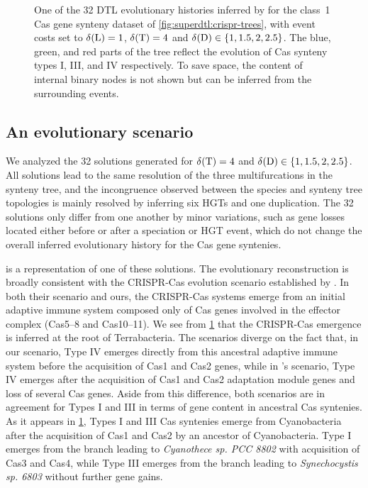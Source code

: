 \begin{figure}[htbp]
    \capstart
    \centering%
    \scalebox{.95}{}%
    \caption[Most parsimonious scenario for the CRISPR-Cas dataset under SuperDTL]{
        One of the 32 DTL evolutionary histories inferred by {\superdtl} for the class~1 Cas gene synteny dataset of \cref{fig:superdtl:crispr-trees}, with event costs set to \(\delta\kern.1pt(\mathrm{L}) = 1\), \(\delta\kern.1pt(\mathrm{T}) = 4\) and \(\delta\kern.1pt(\mathrm{D}) \in \{1, 1.5, 2, 2.5\}\).
        The blue, green, and red parts of the tree reflect the evolution of Cas synteny types I, III, and IV respectively.
        To save space, the content of internal binary nodes is not shown but can be inferred from the surrounding events.
        \label{fig:superdtl:crispr-scenario}
    }
\end{figure}

\subsection{An evolutionary scenario}

We analyzed the 32 solutions generated for \(\delta\kern.1pt(\mathrm{T}) = 4\) and \(\delta\kern.1pt(\mathrm{D}) \in \{1, 1.5, 2, 2.5\}\).
All solutions lead to the same resolution of the three multifurcations in the synteny tree, and the incongruence observed between the species and synteny tree topologies is mainly resolved by inferring six HGTs and one duplication.
The 32 solutions only differ from one another by minor variations, such as gene losses located either before or after a speciation or HGT event, which do not change the overall inferred evolutionary history for the Cas gene syntenies.

 is a representation of one of these solutions.
The evolutionary reconstruction is broadly consistent with the CRISPR-Cas evolution scenario established by \textcite{Koonin2022EvolutionaryPlasticityFunctional}.
In both their scenario and ours, the CRISPR-Cas systems emerge from an initial adaptive immune system composed only of Cas genes involved in the effector complex (Cas5--8 and Cas10--11).
We see from \cref{fig:superdtl:crispr-scenario} that the CRISPR-Cas emergence is inferred at the root of Terrabacteria.
The scenarios diverge on the fact that, in our scenario, Type IV emerges directly from this ancestral adaptive immune system before the acquisition of Cas1 and Cas2 genes, while in \citeauthor{Koonin2022EvolutionaryPlasticityFunctional}'s scenario, Type IV emerges after the acquisition of Cas1 and Cas2 adaptation module genes and loss of several Cas genes.
Aside from this difference, both scenarios are in agreement for Types I and III in terms of gene content in ancestral Cas syntenies.
As it appears in \cref{fig:superdtl:crispr-scenario}, Types I and III Cas syntenies emerge from Cyanobacteria after the acquisition of Cas1 and Cas2 by an ancestor of Cyanobacteria.
Type I emerges from the branch leading to \emph{Cyanothece sp. PCC 8802} with acquisition of Cas3 and Cas4, while Type III emerges from the branch leading to \emph{Synechocystis sp. 6803} without further gene gains.

